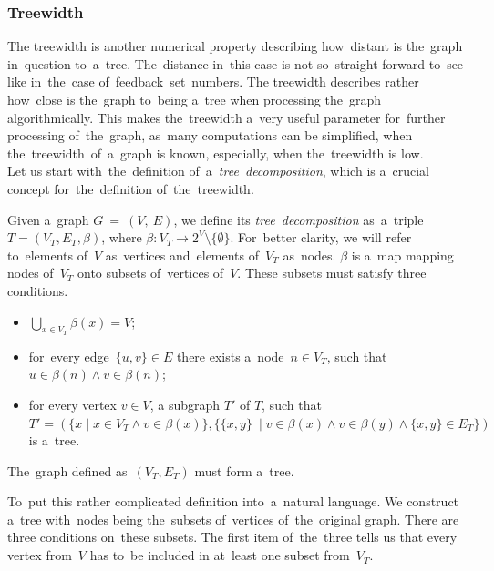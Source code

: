 \subsubsection{Treewidth}
\label{subsubsec:treewidth}
The treewidth is another numerical property describing how~distant is the~graph in~question to~a~tree. The~distance in~this case is not so~straight-forward to~see like in~the~case of~feedback~set~numbers. The treewidth describes rather how~close is the~graph to~being a~tree when processing the~graph algorithmically. This makes the~treewidth a~very useful parameter for~further processing of~the~graph, as~many computations can be simplified, when the~treewidth~of~a~graph is known, especially, when the~treewidth is low.~\cite{Diestel} \\
Let us start with~the~definition of~a~\textit{tree~decomposition}, which is a~crucial concept for~the~definition of~the~treewidth.
\begin{definition}
Given a~graph $G~=~(V,~E)$, we define its \emph{tree~decomposition} as~a~triple $T = (V_T, E_T, \beta)$, where $\beta: V_T \rightarrow 2^V \setminus \{\emptyset\}$. For~better clarity, we will refer to~elements of~$V$ as~vertices and~elements of~$V_T$ as~nodes. $\beta$ is a~map mapping nodes of~$V_T$ onto subsets of~vertices of~$V$. These subsets must satisfy three conditions.
\begin{samepage}
    \begin{itemize}
        \item $\bigcup_{x \in V_T} \beta(x) = V$;
        \item for~every edge~$\{u, v\}\in E$ there exists a~node~$n \in V_T$, such that $u \in \beta(n) \land v \in \beta(n)$;
        \item for every vertex ${v \in V}$, a subgraph $T'$ of $T$, such that\\
        ${T' = (\{x \mid x \in V_T \land v \in \beta(x)\}, \{\{x, y\}\ \mid v \in \beta(x) \land v \in \beta(y) \land \{x, y\} \in E_T\})}$ is a~tree.
    \end{itemize}
\end{samepage}
     The~graph defined as~$(V_T, E_T)$ must form a~tree.
\end{definition}
To~put this rather complicated definition into~a~natural language. We construct a~tree with~nodes being the~subsets of~vertices of~the~original graph. There are three conditions on~these subsets.
The first item of~the~three tells us that every vertex from~$V$ has to~be included in at~least one subset from~$V_T$. \\
